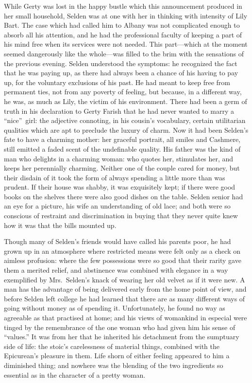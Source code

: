 \documentclass[12pt,a4paper]{book}
\begin{document}
While Gerty was lost in the happy bustle which this announcement
produced in her small household, Selden was at one with her in
thinking with intensity of Lily Bart. The case which had called
him to Albany was not complicated enough to absorb all his
attention, and he had the professional faculty of keeping a part
of his mind free when its services were not needed. This
part---which at the moment seemed dangerously like the whole---was
filled to the brim with the sensations of the previous evening. 
Selden understood the symptoms: he recognized the fact that he
was paying up, as there had always been a chance of his having to
pay up, for the voluntary exclusions of his past. He had meant to
keep free from permanent ties, not from any poverty of feeling,
but because, in a different way, he was, as much as Lily, the
victim of his environment. There had been a germ of truth in his
declaration to Gerty Farish that he had never wanted to marry a
``nice''\ girl: the adjective connoting, in his cousin's vocabulary,
certain utilitarian qualities which are apt to preclude the
luxury of charm. Now it had been Selden's fate to have a charming
mother: her graceful portrait, all smiles and Cashmere, still
emitted a faded scent of the undefinable quality. His father was
the kind of man who delights in a charming woman: who quotes her,
stimulates her, and keeps her perennially charming. Neither one
of the couple cared for money, but their disdain of it took the
form of always spending a little more than was prudent. If their
house was shabby, it was exquisitely kept; if there were good
books on the shelves there were also good dishes on the
table. Selden senior had an eye for a picture, his wife an
understanding of old lace; and both were so conscious of
restraint and discrimination in buying that they never quite knew
how it was that the bills mounted up.





Though many of Selden's friends would have called his parents
poor, he had grown up in an atmosphere where restricted means
were felt only as a check on aimless profusion: where the few
possessions were so good that their rarity gave them a merited
relief, and abstinence was combined with elegance in a way
exemplified by Mrs.\ Selden's knack of wearing her old velvet as
if it were new. A man has the advantage of being delivered early
from the home point of view, and before Selden left college he
had learned that there are as many different ways of going
without money as of spending it. Unfortunately, he found no way
as agreeable as that practised at home; and his views of
womankind in especial were tinged by the remembrance of the one
woman who had given him his sense of ``values.'' It was from her
that he inherited his detachment from the sumptuary side of life: 
the stoic's carelessness of material things, combined with the
Epicurean's pleasure in them. Life shorn of either feeling
appeared to him a diminished thing; and nowhere was the blending
of the two ingredients so essential as in the character of a
pretty woman.
\end{document}
